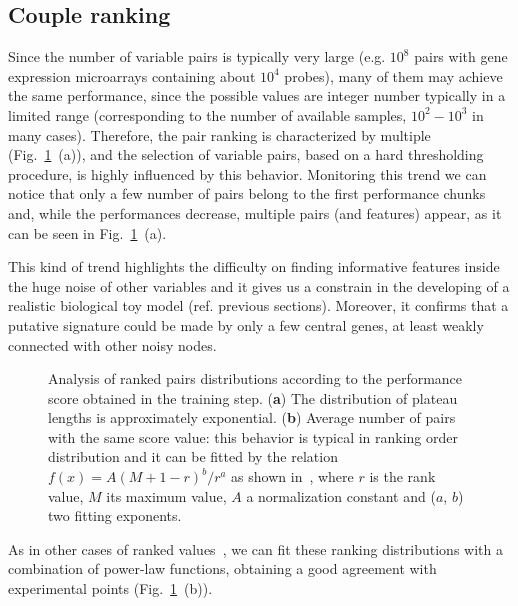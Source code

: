 \documentclass{standalone}
\begin{document}
\subsection[Ranking]{Couple ranking}\label{synapse:ranking}

Since the number of variable pairs is typically very large (e.g. $10^8$ pairs with gene expression microarrays containing about $10^4$ probes), many of them may achieve the same performance, since the possible values are integer number typically in a limited range (corresponding to the number of available samples, $10^2-10^3$ in many cases).
Therefore, the pair ranking is characterized by multiple  (Fig.~\ref{fig:plateaus}~(a)), and the selection of variable pairs, based on a hard thresholding procedure, is highly influenced by this behavior.
Monitoring this trend we can notice that only a few number of pairs belong to the first performance chunks and, while the performances decrease, multiple pairs (and features) appear, as it can be seen in Fig.~\ref{fig:plateaus}~(a).

This kind of trend highlights the difficulty on finding informative features inside the huge noise of other variables and it gives us a constrain in the developing of a realistic biological toy model (ref. previous sections).
Moreover, it confirms that a putative signature could be made by only a few central genes, at least weakly connected with other noisy nodes.

\begin{figure}[htbp]
\centering
\def\svgwidth{0.4\textwidth}

\qquad\qquad
\def\svgwidth{0.4\textwidth}

\caption{Analysis of ranked pairs distributions according to the performance score obtained in the training step.
(\textbf{a}) The distribution of plateau lengths is approximately exponential.
(\textbf{b}) Average number of pairs with the same score value: this behavior is typical in ranking order distribution and it can be fitted by the relation $f(x) = A(M + 1 - r)^b / r^a$ as shown in~\cite{rankfit}, where $r$ is the rank value, $M$ its maximum value, $A$ a normalization constant and ($a$, $b$) two fitting exponents.}
\label{fig:plateaus}
\end{figure}

As in other cases of ranked values~\cite{rankfit}, we can fit these ranking distributions with a combination of power-law functions, obtaining a good agreement with experimental points (Fig.~\ref{fig:plateaus}~(b)).
\end{document}
